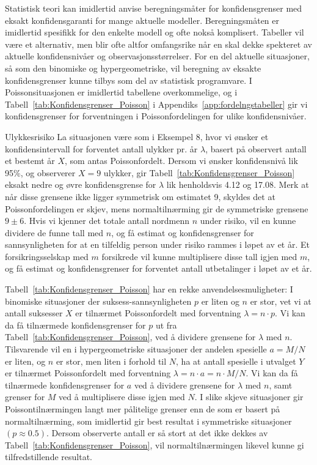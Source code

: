 Statistisk teori kan imidlertid anvise beregningsmåter for
konfidensgrenser med eksakt konfidensgaranti for mange aktuelle
modeller. Beregningsmåten er imidlertid spesifikk for den enkelte
modell og ofte nokså komplisert. Tabeller vil være et alternativ,
men blir ofte altfor omfangsrike når en skal dekke spekteret av
aktuelle konfidensnivåer og obser\-vasjons\-stør\-relser. For en del
aktuelle situasjoner, så som den binomiske og hypergeometriske,
vil beregning av eksakte konfidensgrenser kunne tilbys som del av
statistisk programvare. I Poissonsituasjonen er imidlertid
tabellene overkommelige, og i Tabell~\ref{tab:Konfidensgrenser_Poisson} 
i Appendiks~\ref{app:fordelngstabeller} gir vi
konfidensgrenser for forventningen i Poissonfordelingen for ulike
konfidensnivåer.\\


\begin{eksempel}{ Ulykkesrisiko}
La situasjonen være som i Eksempel 8, hvor vi ønsker et
konfidensintervall for forventet antall ulykker pr. år $\lambda$,
basert på observert antall et bestemt år $X$, som antas
Poissonfordelt. Dersom vi ønsker konfidensnivå lik 95\%, og
observerer $X=9$ ulykker, gir Tabell~\ref{tab:Konfidensgrenser_Poisson} eksakt nedre og øvre
konfidensgrense for $\lambda$ lik henholdsvis 4.12 og 17.08. Merk
at når disse grensene ikke ligger symmetrisk om estimatet 9,
skyldes det at Poissonfordelingen er skjev, mens
normaltilnærming gir de symmetriske grensene $9 \pm 6$. Hvis vi
kjenner det totale antall nordmenn $n$ under risiko, vil en kunne
dividere de funne tall med $n$, og få estimat og konfidensgrenser
for sannsynligheten for at en tilfeldig person under risiko
rammes i løpet av et år. Et forsikringsselskap med $m$ forsikrede
vil kunne multiplisere disse tall igjen med $m$, og få estimat og
konfidensgrenser for forventet antall utbetalinger i løpet av et
år.
\end{eksempel}

Tabell~\ref{tab:Konfidensgrenser_Poisson} har en rekke anvendelsesmuligheter: I binomiske
situasjoner der suksess-sannsynligheten $p$ er liten og $n$ er
stor, vet vi at antall suksesser $X$ er tilnærmet Poissonfordelt
med forventning $\lambda =n\cdot p$. Vi kan da få tilnærmede
konfidensgrenser for $p$ ut fra Tabell~\ref{tab:Konfidensgrenser_Poisson}, ved å dividere grensene
for $\lambda$ med $n$. Tilsvarende vil en i hypergeometriske
situasjoner der andelen spesielle $a=M/N$ er liten, og $n$ er
stor, men liten i forhold til $N$, ha at antall spesielle i
utvalget $Y$ er tilnærmet Poissonfordelt med forventning $\lambda
=n\cdot a=n\cdot M/N$. Vi kan da få tilnærmede konfidensgrenser
for $a$ ved å dividere grensene for $\lambda$ med $n$, samt
grenser for $M$ ved å multiplisere disse igjen med $N$. I slike
skjeve situasjoner gir Poissontilnærmingen langt mer pålitelige
grenser enn de som er basert på normaltilnærming, som imidlertid gir
best resultat i symmetriske situasjoner $(p\approx 0.5)$. Dersom
observerte antall er så stort at det ikke dekkes av Tabell~\ref{tab:Konfidensgrenser_Poisson}, vil
normaltilnærmingen likevel kunne gi tilfredstillende resultat.

